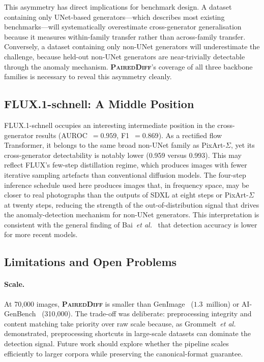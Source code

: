 \documentclass[journal]{IEEEtran}
\newcommand{\datasetname}{\textsc{PairedDiff}}
\newcommand{\etal}{\textit{et al.}}
\begin{document}
This asymmetry has direct implications for benchmark design.
A dataset containing only UNet-based generators---which describes
most existing benchmarks---will systematically overestimate
cross-generator generalisation because it measures within-family
transfer rather than across-family transfer.
Conversely, a dataset containing only non-UNet generators will
underestimate the challenge, because held-out non-UNet generators
are near-trivially detectable through the anomaly mechanism.
\textbf{\datasetname}'s coverage of all three backbone families is
necessary to reveal this asymmetry cleanly.

\subsection{FLUX.1-schnell: A Middle Position}
\label{ssec:disc_flux}

FLUX.1-schnell occupies an interesting intermediate position in the
cross-generator results (AUROC~$= 0.959$, F1~$= 0.869$).
As a rectified flow Transformer, it belongs to the same broad
non-UNet family as PixArt-$\Sigma$, yet its cross-generator
detectability is notably lower (0.959 versus 0.993).
This may reflect FLUX's few-step distillation regime, which
produces images with fewer iterative sampling artefacts than
conventional diffusion models.
The four-step inference schedule used here produces images that, in
frequency space, may be closer to real photographs than the outputs
of SDXL at eight steps or PixArt-$\Sigma$ at twenty steps,
reducing the strength of the out-of-distribution signal that drives
the anomaly-detection mechanism for non-UNet generators.
This interpretation is consistent with the general finding of
Bai~\etal~\cite{bai2026opendetect} that detection accuracy is lower
for more recent models.

\subsection{Limitations and Open Problems}
\label{ssec:disc_limits}

\paragraph{Scale.}
At 70{,}000 images, \textbf{\datasetname} is smaller than
GenImage~\cite{zhu2023genimage} ($1.3$~million) or
AI-GenBench~\cite{pellegrini2025aigenbench} (310{,}000).
The trade-off was deliberate: preprocessing integrity and content
matching take priority over raw scale because, as Grommelt~\etal\
\cite{grommelt2024jpeg} demonstrated, preprocessing shortcuts in
large-scale datasets can dominate the detection signal.
Future work should explore whether the pipeline scales efficiently
to larger corpora while preserving the canonical-format guarantee.
\end{document}
